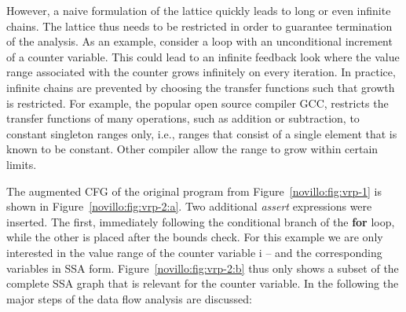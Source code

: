 However, a naive formulation of the lattice quickly leads to long or even
infinite chains. The lattice thus needs to be restricted in order to guarantee
termination of the analysis. As an example, consider a loop with an
unconditional increment of a counter variable. This could lead to an infinite
feedback look where the value range associated with the counter grows infinitely
on every iteration. In practice, infinite chains are prevented by choosing the
transfer functions such that growth is restricted. For example, the popular open
source compiler GCC, restricts the transfer functions of many operations, such
as addition or subtraction, to constant singleton ranges only, i.e., ranges that
consist of a single element that is known to be constant. Other compiler allow
the range to grow within certain limits.

The augmented CFG of the original program from Figure~\ref{novillo:fig:vrp-1} is
shown in Figure~\ref{novillo:fig:vrp-2:a}. Two additional \emph{assert}
expressions were inserted. The first, immediately following the conditional
branch of the \textbf{for} loop, while the other is placed after the bounds
check. For this example we are only interested in the value range of the counter
variable i -- and the corresponding variables in SSA form.
Figure~\ref{novillo:fig:vrp-2:b} thus only shows a subset of the complete SSA
graph that is relevant for the counter variable. In the following the major
steps of the data flow analysis are discussed:
